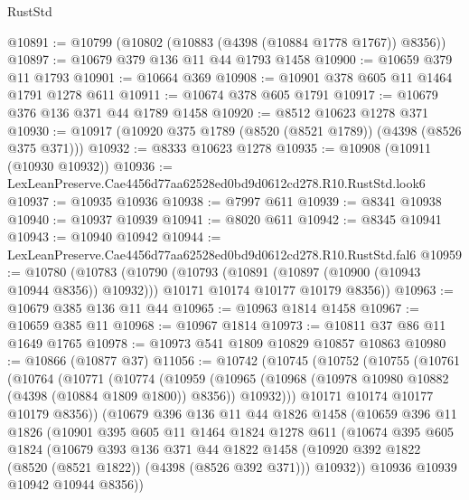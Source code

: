 \begin{lexlean}{RustStd}
\begin{coremodule}
@10891 := @10799 (@10802 (@10883 (@4398 (@10884 @1778 @1767)) @8356))
@10897 := @10679 @379 @136 @11 @44 @1793 @1458
@10900 := @10659 @379 @11 @1793
@10901 := @10664 @369
@10908 := @10901 @378 @605 @11 @1464 @1791 @1278 @611
@10911 := @10674 @378 @605 @1791
@10917 := @10679 @376 @136 @371 @44 @1789 @1458
@10920 := @8512 @10623 @1278 @371
@10930 := @10917 (@10920 @375 @1789 (@8520 (@8521 @1789)) (@4398 (@8526 @375 @371)))
@10932 := @8333 @10623 @1278
@10935 := @10908 (@10911 (@10930 @10932))
@10936 := LexLeanPreserve.Cae4456d77aa62528ed0bd9d0612cd278.R10.RustStd.look6
@10937 := @10935 @10936
@10938 := @7997 @611
@10939 := @8341 @10938
@10940 := @10937 @10939
@10941 := @8020 @611
@10942 := @8345 @10941
@10943 := @10940 @10942
@10944 := LexLeanPreserve.Cae4456d77aa62528ed0bd9d0612cd278.R10.RustStd.fal6
@10959 := @10780
    (@10783
      (@10790
        (@10793 (@10891 (@10897 (@10900 (@10943 @10944 @8356)) @10932)))
        @10171
        @10174
        @10177
        @10179
        @8356))
@10963 := @10679 @385 @136 @11 @44
@10965 := @10963 @1814 @1458
@10967 := @10659 @385 @11
@10968 := @10967 @1814
@10973 := @10811 @37 @86 @11 @1649 @1765
@10978 := @10973 @541 @1809 @10829 @10857 @10863
@10980 := @10866 (@10877 @37)
@11056 := @10742
    (@10745
      (@10752
        (@10755
          (@10761
            (@10764
              (@10771
                (@10774
                  (@10959
                    (@10965
                      (@10968 (@10978 @10980 @10882 (@4398 (@10884 @1809 @1800)) @8356))
                      @10932)))
                @10171
                @10174
                @10177
                @10179
                @8356))
            (@10679
              @396
              @136
              @11
              @44
              @1826
              @1458
              (@10659
                @396
                @11
                @1826
                (@10901
                  @395
                  @605
                  @11
                  @1464
                  @1824
                  @1278
                  @611
                  (@10674
                    @395
                    @605
                    @1824
                    (@10679
                      @393
                      @136
                      @371
                      @44
                      @1822
                      @1458
                      (@10920 @392 @1822 (@8520 (@8521 @1822)) (@4398 (@8526 @392 @371)))
                      @10932))
                  @10936
                  @10939
                  @10942
                  @10944
                  @8356))

\end{coremodule}
\end{lexlean}
